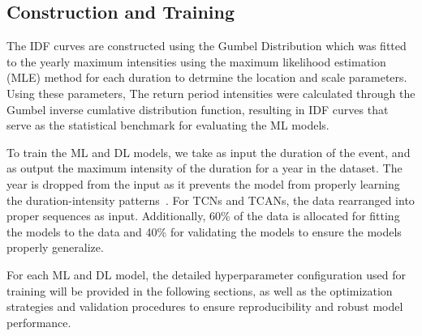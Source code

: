 \subsection{Construction and Training}
The IDF curves are constructed using the Gumbel Distribution which was fitted to the yearly maximum intensities using the maximum likelihood estimation (MLE) method for each duration to detrmine the location and scale parameters.
Using these parameters, The return period intensities were calculated through the Gumbel inverse cumlative distribution function, resulting in IDF curves that serve as the statistical benchmark for evaluating the ML models.

\vspace{1em}

To train the ML and DL models, we take as input the duration of the event, and as output the maximum intensity of the duration for a year in the dataset. The year is dropped from the input as it prevents the model from properly learning the duration-intensity patterns~\cite{14}. For TCNs and TCANs, the data rearranged into proper sequences as input. Additionally, 60\% of the data is allocated for fitting the models to the data and 40\% for validating the models to ensure the models properly generalize. 

\vspace{1em}

For each ML and DL model, the detailed hyperparameter configuration used for training will be provided in the following sections, as well as the optimization strategies and validation procedures to ensure reproducibility and robust model performance.